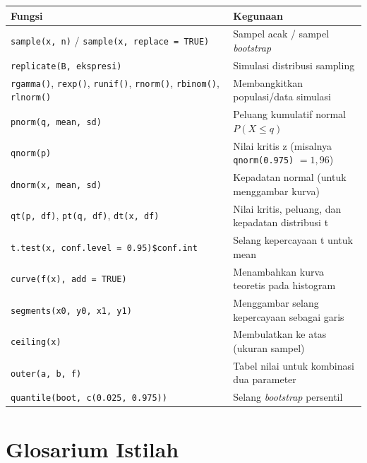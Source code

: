 \documentclass[
  indonesian,
  letterpaper,
]{book}
\newcounter{none} %
\begin{document}
{\def\LTcaptype{none} %
\begin{longtable}[]{@{}
  >{\raggedright\arraybackslash}p{}
  >{\raggedright\arraybackslash}p{}@{}}
\toprule\noalign{}
\begin{minipage}[b]{\linewidth}\raggedright
Fungsi
\end{minipage} & \begin{minipage}[b]{\linewidth}\raggedright
Kegunaan
\end{minipage} \\
\midrule\noalign{}
\endhead
\bottomrule\noalign{}
\endlastfoot
\texttt{sample(x,\ n)} / \texttt{sample(x,\ replace\ =\ TRUE)} & Sampel
acak / sampel \emph{bootstrap} \\
\texttt{replicate(B,\ ekspresi)} & Simulasi distribusi sampling \\
\texttt{rgamma()}, \texttt{rexp()}, \texttt{runif()}, \texttt{rnorm()},
\texttt{rbinom()}, \texttt{rlnorm()} & Membangkitkan populasi/data
simulasi \\
\texttt{pnorm(q,\ mean,\ sd)} & Peluang kumulatif normal
\(P(X \le q)\) \\
\texttt{qnorm(p)} & Nilai kritis z (misalnya \texttt{qnorm(0.975)}
\(= 1,96\)) \\
\texttt{dnorm(x,\ mean,\ sd)} & Kepadatan normal (untuk menggambar
kurva) \\
\texttt{qt(p,\ df)}, \texttt{pt(q,\ df)}, \texttt{dt(x,\ df)} & Nilai
kritis, peluang, dan kepadatan distribusi t \\
\texttt{t.test(x,\ conf.level\ =\ 0.95)\$conf.int} & Selang kepercayaan
t untuk mean \\
\texttt{curve(f(x),\ add\ =\ TRUE)} & Menambahkan kurva teoretis pada
histogram \\
\texttt{segments(x0,\ y0,\ x1,\ y1)} & Menggambar selang kepercayaan
sebagai garis \\
\texttt{ceiling(x)} & Membulatkan ke atas (ukuran sampel) \\
\texttt{outer(a,\ b,\ f)} & Tabel nilai untuk kombinasi dua parameter \\
\texttt{quantile(boot,\ c(0.025,\ 0.975))} & Selang \emph{bootstrap}
persentil \\
\end{longtable}
}


\chapter{Glosarium Istilah}\label{glosarium-istilah}
\end{document}
